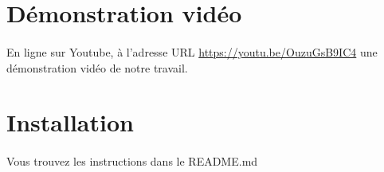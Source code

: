\documentclass[a4paper]{article}
\begin{document}
        \section*{Démonstration vidéo}
            \paragraph{}
                En ligne sur Youtube, à l'adresse URL \url{https://youtu.be/OuzuGsB9IC4} une démonstration vidéo de notre travail.
        \section*{Installation}
            \paragraph{}
                Vous trouvez les instructions dans le README.md
\end{document}
